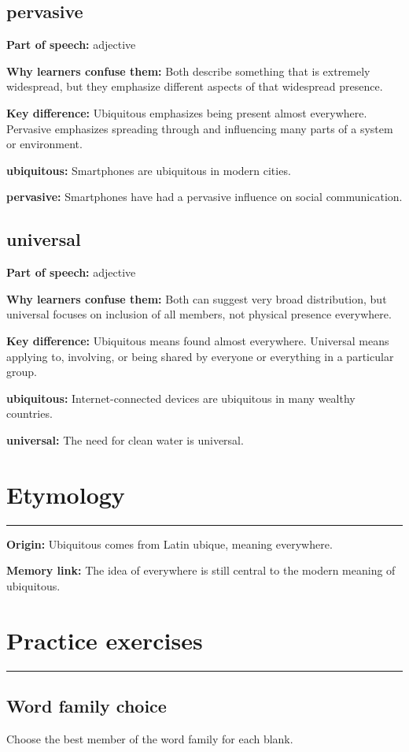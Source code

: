 \documentclass[11pt]{article}
\newcommand{\sectionrule}{\par\vspace{-0.5em}\noindent\textcolor{Accent}{\rule{\linewidth}{0.6pt}}\par}
\begin{document}
\subsection{pervasive}
\textbf{Part of speech:} adjective

\textbf{Why learners confuse them:} Both describe something that is extremely widespread, but they emphasize different aspects of that widespread presence.

\textbf{Key difference:} Ubiquitous emphasizes being present almost everywhere. Pervasive emphasizes spreading through and influencing many parts of a system or environment.

\textbf{ubiquitous:} Smartphones are ubiquitous in modern cities.

\textbf{pervasive:} Smartphones have had a pervasive influence on social communication.

\subsection{universal}
\textbf{Part of speech:} adjective

\textbf{Why learners confuse them:} Both can suggest very broad distribution, but universal focuses on inclusion of all members, not physical presence everywhere.

\textbf{Key difference:} Ubiquitous means found almost everywhere. Universal means applying to, involving, or being shared by everyone or everything in a particular group.

\textbf{ubiquitous:} Internet-connected devices are ubiquitous in many wealthy countries.

\textbf{universal:} The need for clean water is universal.

\section{Etymology}
\sectionrule
\textbf{Origin:} Ubiquitous comes from Latin ubique, meaning everywhere.

\textbf{Memory link:} The idea of everywhere is still central to the modern meaning of ubiquitous.

\section{Practice exercises}
\sectionrule
\subsection{Word family choice}
Choose the best member of the word family for each blank.
\end{document}
